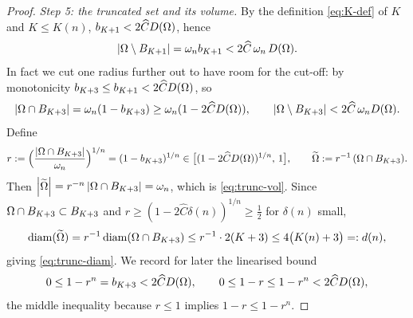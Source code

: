 \begin{proof}
\smallskip
\emph{Step 5: the truncated set and its volume.}
By the definition \eqref{eq:K-def} of $K$ and $K\le K(n)$,
$b_{K+1}<2\widehat C D(\Omega)$, hence
\begin{equation}\label{eq:tail-controlled}
   \left|\Omega\setminus B_{K+1}\right|=\omega_n b_{K+1}<2\widehat C\,\omega_n\,D(\Omega).
\end{equation}
In fact we cut one radius further out to have room for the cut-off: by
monotonicity $b_{K+3}\le b_{K+1}<2\widehat C D(\Omega)$, so
\begin{equation}\label{eq:vol-cut}
   \left|\Omega\cap B_{K+3}\right|=\omega_n(1-b_{K+3})\ge\omega_n(1-2\widehat C D(\Omega)),
   \qquad
   \left|\Omega\setminus B_{K+3}\right|<2\widehat C\,\omega_n D(\Omega).
\end{equation}
Define
\[
   r:=\Bigl(\frac{\left|\Omega\cap B_{K+3}\right|}{\omega_n}\Bigr)^{1/n}
   =(1-b_{K+3})^{1/n}\in\bigl[(1-2\widehat C D(\Omega))^{1/n},\,1\bigr],
   \qquad
   \widetilde{\Omega}:=r^{-1}\,(\Omega\cap B_{K+3}).
\]
Then $\left|\widetilde{\Omega}\right|=r^{-n}\left|\Omega\cap B_{K+3}\right|=\omega_n$, which is
\eqref{eq:trunc-vol}.
Since $\Omega\cap B_{K+3}\subset B_{K+3}$ and
$r\ge(1-2\widehat C\delta(n))^{1/n}\ge\tfrac12$ for $\delta(n)$ small,
\[
   \operatorname{diam}(\widetilde{\Omega})=r^{-1}\operatorname{diam}(\Omega\cap B_{K+3})\le r^{-1}\cdot2(K+3)
   \le4\bigl(K(n)+3\bigr)=:d(n),
\]
giving \eqref{eq:trunc-diam}.
We record for later the linearised bound
\begin{equation}\label{eq:r-near-1}
   0\le1-r^n=b_{K+3}<2\widehat C D(\Omega),
   \qquad
   0\le1-r\le1-r^n<2\widehat C D(\Omega),
\end{equation}
the middle inequality because $r\le1$ implies $1-r\le1-r^n$.


\end{proof}
